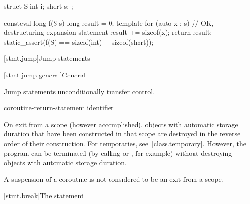 \pnum
\begin{example}
\begin{codeblock}
struct S {
  int i;
  short s;
};

consteval long f(S s) {
  long result = 0;
  template for (auto x : s) {                           // OK, destructuring expansion statement
    result += sizeof(x);
  }
  return result;
}
static_assert(f(S{}) == sizeof(int) + sizeof(short));
\end{codeblock}
\end{example}


[stmt.jump]{Jump statements}%

[stmt.jump.general]{General}%

\pnum
Jump statements unconditionally transfer control.
%

%
%
%
%
%
%
\begin{bnf}
\br
     \terminal{;}\br
     \terminal{;}\br
      \terminal{;}\br
    coroutine-return-statement\br
     identifier \terminal{;}
\end{bnf}

\pnum
{}%
%
\begin{note}
On exit from a scope (however accomplished), objects with automatic storage
duration that have been constructed in that scope are destroyed
in the reverse order of their construction.
For temporaries, see~\ref{class.temporary}.
However, the program can be terminated (by calling
%
%
 or
%
%
, for example) without
destroying objects with automatic storage duration.
\end{note}
\begin{note}
A suspension of a coroutine is not considered to be an exit from a scope.
\end{note}

[stmt.break]{The  statement}%

